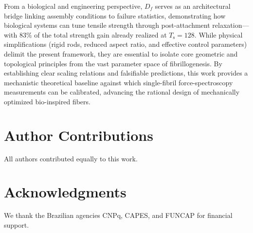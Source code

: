 \documentclass[aps,physrev,preprint,groupedaddress,linenumbers]{revtex4-2}
\begin{document}
From a biological and engineering perspective, $D_f$ serves as an architectural bridge linking assembly conditions to failure statistics, demonstrating how biological systems can tune tensile strength through post-attachment relaxation—with $83\%$ of the total strength gain already realized at $T_{\mathrm{s}}=128$. While physical simplifications (rigid rods, reduced aspect ratio, and effective control parameters) delimit the present framework, they are essential to isolate core geometric and topological principles from the vast parameter space of fibrillogenesis. By establishing clear scaling relations and falsifiable predictions, this work provides a mechanistic theoretical baseline against which single-fibril force-spectroscopy measurements can be calibrated, advancing the rational design of mechanically optimized bio-inspired fibers.

\section{Author Contributions}
All authors contributed equally to this work.

\section{Acknowledgments}
We thank the Brazilian agencies CNPq, CAPES, and FUNCAP for financial support.



%

\end{document}
